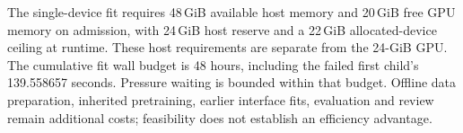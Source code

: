 The single-device fit requires 48\,GiB available host memory and 20\,GiB free
GPU memory on admission, with 24\,GiB host reserve and a 22\,GiB allocated-device
ceiling at runtime. These host requirements are separate from the 24-GiB GPU.
The cumulative fit wall budget is 48 hours, including the failed first child's
139.558657 seconds. Pressure waiting is bounded within that budget. Offline data
preparation, inherited pretraining, earlier interface fits, evaluation and review
remain additional costs; feasibility does not establish an efficiency advantage.
